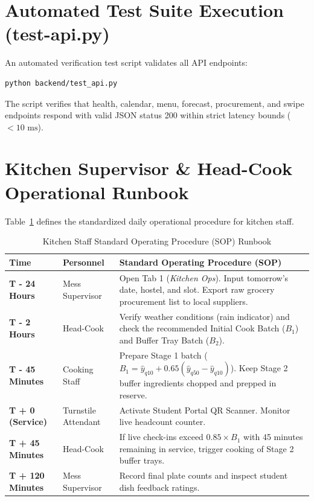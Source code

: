 \documentclass[11pt,a4paper,oneside]{report}
\begin{document}
\section{Automated Test Suite Execution (test-api.py)}
An automated verification test script validates all API endpoints:
\begin{lstlisting}[language=bash,caption=Executing API Automated Test Suite]
python backend/test_api.py
\end{lstlisting}
The script verifies that health, calendar, menu, forecast, procurement, and swipe endpoints respond with valid JSON status 200 within strict latency bounds ($<10\text{ ms}$).

\section{Kitchen Supervisor \& Head-Cook Operational Runbook}
Table~\ref{tab:runbook} defines the standardized daily operational procedure for kitchen staff.

\begin{table}[ht]
\centering
\small
\renewcommand{\arraystretch}{1.3}
\begin{tabularx}{\textwidth}{llX}
\toprule
\rowcolor{bluelight}
\textbf{Time} & \textbf{Personnel} & \textbf{Standard Operating Procedure (SOP)} \\
\midrule
\textbf{T - 24 Hours} & Mess Supervisor & Open Tab 1 (\textit{Kitchen Ops}). Input tomorrow's date, hostel, and slot. Export raw grocery procurement list to local suppliers. \\
\textbf{T - 2 Hours} & Head-Cook & Verify weather conditions (rain indicator) and check the recommended Initial Cook Batch ($B_1$) and Buffer Tray Batch ($B_2$). \\
\textbf{T - 45 Minutes} & Cooking Staff & Prepare Stage 1 batch ($B_1 = \hat{y}_{q10} + 0.65(\hat{y}_{q50} - \hat{y}_{q10})$). Keep Stage 2 buffer ingredients chopped and prepped in reserve. \\
\textbf{T + 0 (Service)} & Turnstile Attendant & Activate Student Portal QR Scanner. Monitor live headcount counter. \\
\textbf{T + 45 Minutes} & Head-Cook & If live check-ins exceed $0.85 \times B_1$ with 45 minutes remaining in service, trigger cooking of Stage 2 buffer trays. \\
\textbf{T + 120 Minutes} & Mess Supervisor & Record final plate counts and inspect student dish feedback ratings. \\
\bottomrule
\end{tabularx}
\caption{Kitchen Staff Standard Operating Procedure (SOP) Runbook}
\label{tab:runbook}
\end{table}
\end{document}
